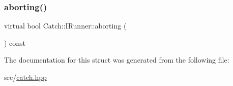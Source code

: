 \subsubsection{\texorpdfstring{aborting()}{aborting()}}
{\footnotesize\ttfamily virtual bool Catch\+::\+I\+Runner\+::aborting (\begin{DoxyParamCaption}{ }\end{DoxyParamCaption}) const\hspace{0.3cm}{\ttfamily [pure virtual]}}



The documentation for this struct was generated from the following file\+:\begin{DoxyCompactItemize}
\item 
src/\hyperlink{catch_8hpp}{catch.\+hpp}\end{DoxyCompactItemize}
